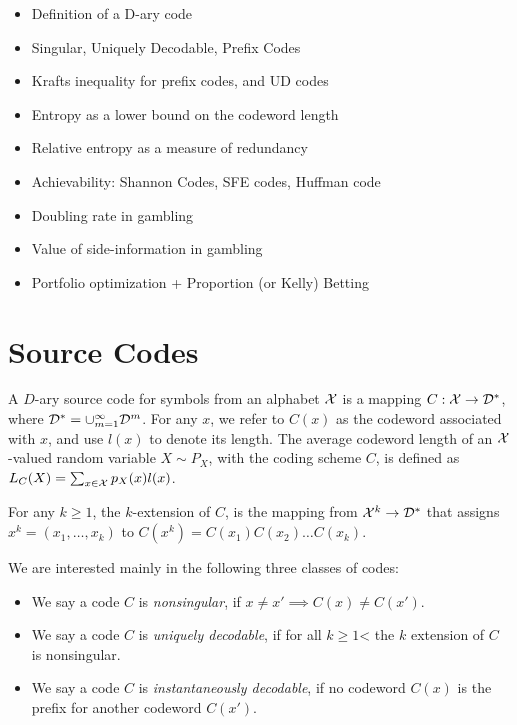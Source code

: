 \begin{itemize}
    \item Definition of a D-ary code 
    \item Singular, Uniquely Decodable, Prefix Codes 
    \item Krafts inequality for prefix codes, and UD codes 
    \item Entropy as a lower bound on the codeword length 
    \item Relative entropy as a measure of redundancy 
    \item Achievability: Shannon Codes, SFE codes, Huffman code 
    \item Doubling rate in gambling 
    \item Value of side-information in gambling 
    \item Portfolio optimization + Proportion (or Kelly) Betting 
\end{itemize}

\section{Source Codes}
    
    \begin{definition}
        \label{def:source-codes}  A $D$-ary source code for symbols from an alphabet $\mathcal{X}$ is a mapping $C:\mathcal{X} \to \mathcal{D}^*$, where $\mathcal{D}^* = \cup_{m=1}^\infty \mathcal{D}^m$.  For any $x$, we refer to $C(x)$ as the codeword associated with $x$, and use $l(x)$ to denote its length. The average codeword length of an $\mathcal{X}$-valued random variable $X \sim P_X$, with the coding scheme $C$, is defined as $L_C(X) = \sum_{x \in \mathcal{X}} p_X(x) l(x)$. 

        For any $k \geq 1$, the $k$-extension of $C$, is the mapping from $\mathcal{X}^k \to \mathcal{D}^*$ that assigns $x^k = (x_1, \ldots, x_k)$ to $C(x^k) = C(x_1)C(x_2)\ldots C(x_k)$. 
    \end{definition}

    \begin{definition}
    \label{def:types-of-codes} We are interested mainly in the following three classes of codes: 
      \begin{itemize}
            \item We say a code $C$ is \emph{nonsingular}, if $x \neq x' \implies C(x) \neq C(x')$. 
            \item We say a code $C$ is \emph{uniquely decodable}, if for all $k \geq 1$< the $k$ extension of $C$ is nonsingular. 
            \item We say a code $C$ is \emph{instantaneously decodable}, if no codeword $C(x)$ is the prefix for another codeword $C(x')$. 
        \end{itemize}
    \end{definition}

